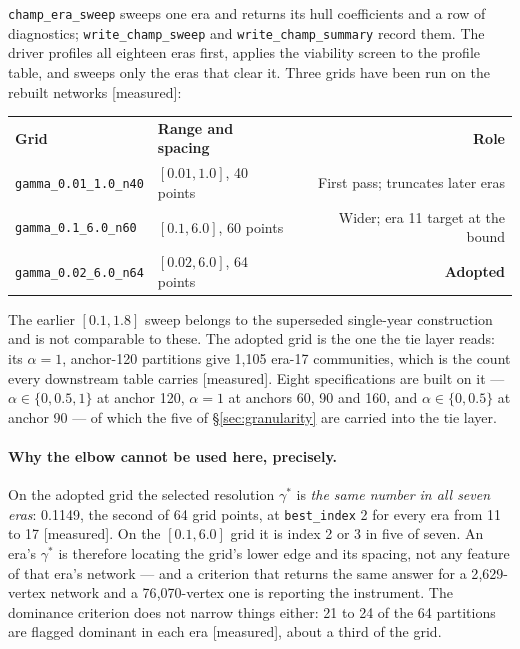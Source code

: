 \documentclass[11pt]{article}
\newcommand{\doublerule}{%
  \specialrule{\lightrulewidth}{0pt}{\doublerulesep}%
  \specialrule{\lightrulewidth}{0pt}{0pt}}
\newcommand{\meas}{{\footnotesize\textsf{[measured]}}}
\newcommand{\code}[1]{\texttt{\small #1}}
\begin{document}
\code{champ\_era\_sweep} sweeps one era and returns its hull coefficients and a row of
diagnostics; \code{write\_champ\_sweep} and \code{write\_champ\_summary} record them. The
driver profiles all eighteen eras first, applies the viability screen to the profile table,
and sweeps only the eras that clear it. Three grids have been run on the rebuilt networks
\meas{}:

\begin{center}
\small
\begin{tabular}{@{}llr@{}}
\toprule
\textbf{Grid} & \textbf{Range and spacing} & \textbf{Role}\\
\doublerule
\code{gamma\_0.01\_1.0\_n40} & $[0.01, 1.0]$, 40 points & First pass; truncates later eras\\
\code{gamma\_0.1\_6.0\_n60}  & $[0.1, 6.0]$, 60 points  & Wider; era 11 target at the bound\\
\code{gamma\_0.02\_6.0\_n64} & $[0.02, 6.0]$, 64 points & \textbf{Adopted}\\
\bottomrule
\end{tabular}
\end{center}

\noindent The earlier $[0.1, 1.8]$ sweep belongs to the superseded single-year construction
and is not comparable to these. The adopted grid is the one the tie layer reads: its
$\alpha = 1$, anchor-120 partitions give 1{,}105 era-17 communities, which is the count every
downstream table carries \meas{}. Eight specifications are built on it --- $\alpha \in
\{0, 0.5, 1\}$ at anchor 120, $\alpha = 1$ at anchors 60, 90 and 160, and $\alpha \in
\{0, 0.5\}$ at anchor 90 --- of which the five of \S\ref{sec:granularity} are carried into
the tie layer.

\paragraph{Why the elbow cannot be used here, precisely.} On the adopted grid the selected
resolution $\gamma^{*}$ is \emph{the same number in all seven eras}: 0.1149, the second of
64 grid points, at \code{best\_index} 2 for every era from 11 to 17 \meas{}. On the
$[0.1, 6.0]$ grid it is index 2 or 3 in five of seven. An era's $\gamma^{*}$ is therefore
locating the grid's lower edge and its spacing, not any feature of that era's network --- and
a criterion that returns the same answer for a 2{,}629-vertex network and a 76{,}070-vertex
one is reporting the instrument. The dominance criterion does not narrow things either: 21 to
24 of the 64 partitions are flagged dominant in each era \meas{}, about a third of the grid.
\end{document}

